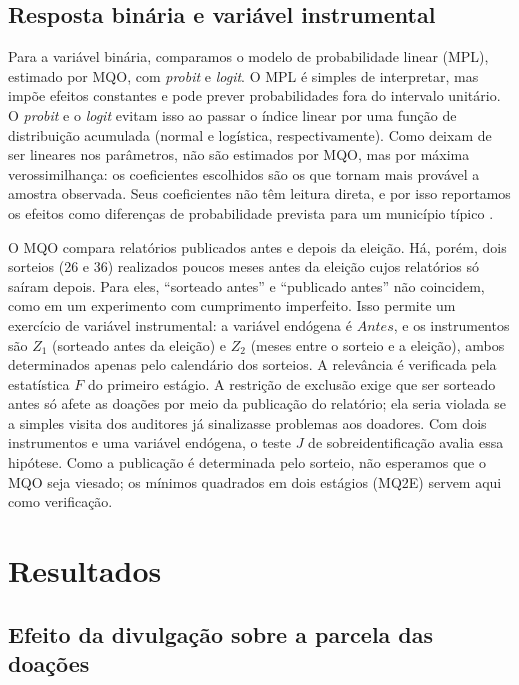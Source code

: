 \subsection{Resposta binária e variável instrumental}\label{sec:binvi}

Para a variável binária, comparamos o modelo de probabilidade linear (MPL), estimado por MQO, com
\textit{probit} e \textit{logit}. O MPL é simples de interpretar, mas impõe efeitos constantes e pode
prever probabilidades fora do intervalo unitário. O \textit{probit} e o \textit{logit} evitam isso ao
passar o índice linear por uma função de distribuição acumulada (normal e logística, respectivamente).
Como deixam de ser lineares nos parâmetros, não são estimados por MQO, mas por máxima verossimilhança: os
coeficientes escolhidos são os que tornam mais provável a amostra observada. Seus coeficientes não têm
leitura direta, e por isso reportamos os efeitos como diferenças de probabilidade prevista para um
município típico \cite{stockwatson2019}.

O MQO compara relatórios publicados antes e depois da eleição. Há, porém, dois sorteios (26 e 36)
realizados poucos meses antes da eleição cujos relatórios só saíram depois. Para eles, ``sorteado antes'' e
``publicado antes'' não coincidem, como em um experimento com cumprimento imperfeito. Isso permite um
exercício de variável instrumental: a variável endógena é $\mathit{Antes}$, e os instrumentos são $Z_1$
(sorteado antes da eleição) e $Z_2$ (meses entre o sorteio e a eleição), ambos determinados apenas pelo
calendário dos sorteios. A relevância é verificada pela estatística $F$ do primeiro estágio. A restrição de
exclusão exige que ser sorteado antes só afete as doações por meio da publicação do relatório; ela seria
violada se a simples visita dos auditores já sinalizasse problemas aos doadores. Com dois instrumentos e
uma variável endógena, o teste $J$ de sobreidentificação avalia essa hipótese. Como a publicação é
determinada pelo sorteio, não esperamos que o MQO seja viesado; os mínimos quadrados em dois estágios
(MQ2E) servem aqui como verificação.

\FloatBarrier
\section{Resultados}\label{sec:result}

\subsection{Efeito da divulgação sobre a parcela das doações}

